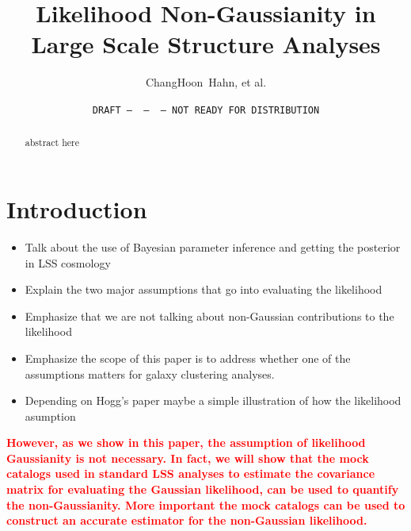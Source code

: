 \documentclass[12pt, letterpaper, preprint]{aastex}
\newcommand{\todo}[1]{{\bf \textcolor{red}{#1}}}
\begin{document}
\sloppy\sloppypar\frenchspacing 

\title{Likelihood Non-Gaussianity in Large Scale Structure Analyses}
\date{\texttt{DRAFT~---~\githash~---~\gitdate~---~NOT READY FOR DISTRIBUTION}}
\author{ChangHoon~Hahn, et al.} %

\begin{abstract}
    abstract here 
\end{abstract}


\section{Introduction}
\begin{itemize}
    \item Talk about the use of Bayesian parameter inference and getting the posterior in LSS cosmology 
    \item Explain the two major assumptions that go into evaluating the likelihood
    \item Emphasize that we are not talking about non-Gaussian contributions to the likelihood
    \item Emphasize the scope of this paper is to address whether one of the assumptions matters for 
        galaxy clustering analyses. 
\end{itemize}

\begin{itemize}
    \item Depending on Hogg's paper maybe a simple illustration of how the likelihood asumption 
\end{itemize}

\todo{However, as we show in this paper, the assumption of likelihood 
Gaussianity is not necessary. In fact, we will show that the mock catalogs 
used in standard LSS analyses to estimate the covariance matrix for 
evaluating the Gaussian likelihood, can be used to quantify the non-Gaussianity. 
More important the mock catalogs can be used to construct an accurate 
estimator for the non-Gaussian likelihood.} 
\end{document}
